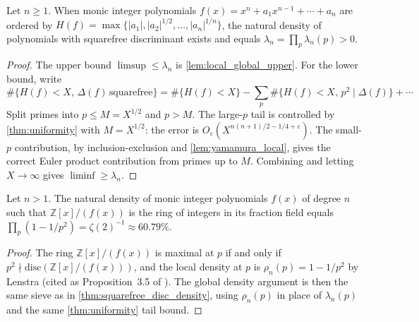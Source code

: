 \begin{theorem}
  \label{thm:squarefree_disc_density}
  Let \(n\geq 1\).  When monic integer polynomials
  \(f(x)=x^n+a_1x^{n-1}+\cdots+a_n\) are ordered by
  \(H(f)=\max\{|a_1|,|a_2|^{1/2},\ldots,|a_n|^{1/n}\}\), the natural
  density of polynomials with squarefree discriminant exists and equals
  \(\lambda_n=\prod_p\lambda_n(p)>0\).
\end{theorem}
\begin{proof}
  The upper bound \(\limsup\leq\lambda_n\) is \cref{lem:local_global_upper}.
  For the lower bound, write
  \[
    \#\{H(f)<X,\,\Delta(f)\,\text{squarefree}\}
    =\#\{H(f)<X\}-\sum_{p}\#\{H(f)<X,\,p^2\mid\Delta(f)\}+\cdots
  \]
  Split primes into \(p\leq M=X^{1/2}\) and \(p>M\).  The large-\(p\)
  tail is controlled by \cref{thm:uniformity} with \(M=X^{1/2}\):
  the error is \(O_\varepsilon(X^{n(n+1)/2-1/4+\varepsilon})\).
  The small-\(p\) contribution, by inclusion-exclusion and
  \cref{lem:yamamura_local}, gives the correct Euler product
  contribution from primes up to \(M\).  Combining and letting
  \(X\to\infty\) gives \(\liminf\geq\lambda_n\).
\end{proof}

\begin{theorem}
  \label{thm:maximal_order_density}
  Let \(n>1\).  The natural density of monic integer polynomials
  \(f(x)\) of degree \(n\) such that \(\mathbb{Z}[x]/(f(x))\) is the
  ring of integers in its fraction field equals
  \(\prod_p(1-1/p^2)=\zeta(2)^{-1}\approx 60.79\%\).
\end{theorem}
\begin{proof}
  The ring \(\mathbb{Z}[x]/(f(x))\) is maximal at \(p\) if and only if
  \(p^2\nmid\mathrm{disc}(\mathbb{Z}[x]/(f(x)))\), and the local
  density at \(p\) is \(\rho_n(p)=1-1/p^2\) by Lenstra (cited as
  Proposition~3.5 of \cite{ABZ}).  The global density argument is
  then the same sieve as in \cref{thm:squarefree_disc_density},
  using \(\rho_n(p)\) in place of \(\lambda_n(p)\) and the same
  \cref{thm:uniformity} tail bound.
\end{proof}

